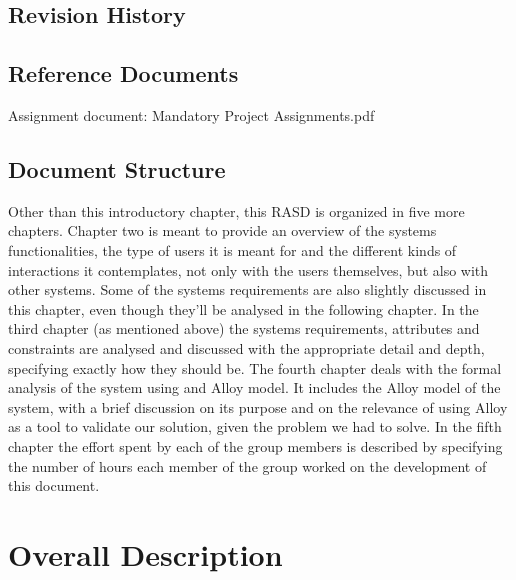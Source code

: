 \documentclass[12pt]{article}
\begin{document}
\subsection{Revision History}

\subsection{Reference Documents}
Assignment document: Mandatory Project Assignments.pdf

\subsection{Document Structure}
Other than this introductory chapter, this RASD is organized in five more chapters. Chapter two is meant to provide an overview of the systems functionalities, the type of users it is meant for and the different kinds of interactions it contemplates, not only with the users themselves, but also with other systems. Some of the systems requirements are also slightly discussed in this chapter, even though they’ll be analysed in the following chapter. In the third chapter (as mentioned above) the systems requirements, attributes and constraints are analysed and discussed with the appropriate detail and depth, specifying exactly how they should be.
The fourth chapter deals with the formal analysis of the system using and Alloy model. It includes the Alloy model of the system, with a brief discussion on its purpose and on the relevance of using Alloy as a tool to validate our solution, given the problem we had to solve.
In the fifth chapter the effort spent by each of the group members is described by specifying the number of hours each member of the group worked on the development of this document.

\section{Overall Description}
\end{document}
